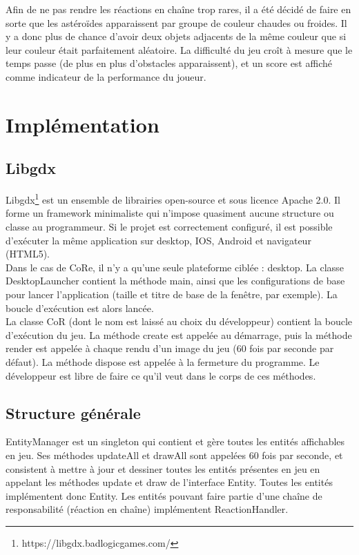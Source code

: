 \documentclass[11pt,a4paper,twoside,svgnames]{article}
\begin{document}
Afin de ne pas rendre les réactions en chaîne trop rares, il a été décidé de faire en sorte que les astéroïdes apparaissent par groupe de couleur chaudes ou froides. Il y a donc plus de chance d'avoir deux objets adjacents de la même couleur que si leur couleur était parfaitement aléatoire. La difficulté du jeu croît à mesure que le temps passe (de plus en plus d'obstacles apparaissent), et un score est affiché comme indicateur de la performance du joueur.

\section{Implémentation}
\subsection{Libgdx}
Libgdx\footnote{https://libgdx.badlogicgames.com/} est un ensemble de librairies open-source et sous licence Apache 2.0. Il forme un framework minimaliste qui n'impose quasiment aucune structure ou classe au programmeur. Si le projet est correctement configuré, il est possible d'exécuter la même application sur desktop, IOS, Android et navigateur (HTML5).\\

Dans le cas de CoRe, il n'y a qu'une seule plateforme ciblée : desktop. La classe DesktopLauncher contient la méthode main, ainsi que les configurations de base pour lancer l'application (taille et titre de base de la fenêtre, par exemple). La boucle d'exécution est alors lancée.\\

La classe CoR (dont le nom est laissé au choix du développeur) contient la boucle d'exécution du jeu. La méthode create est appelée au démarrage, puis la méthode render est appelée à chaque rendu d'un image du jeu (60 fois par seconde par défaut). La méthode dispose est appelée à la fermeture du programme. Le développeur est libre de faire ce qu'il veut dans le corps de ces méthodes.

\subsection{Structure générale}
EntityManager est un singleton qui contient et gère toutes les entités affichables en jeu. Ses méthodes updateAll et drawAll sont appelées 60 fois par seconde, et consistent à mettre à jour et dessiner toutes les entités présentes en jeu en appelant les méthodes update et draw de l'interface Entity. Toutes les entités implémentent donc Entity. Les entités pouvant faire partie d'une chaîne de responsabilité (réaction en chaîne) implémentent ReactionHandler.\\
\end{document}
